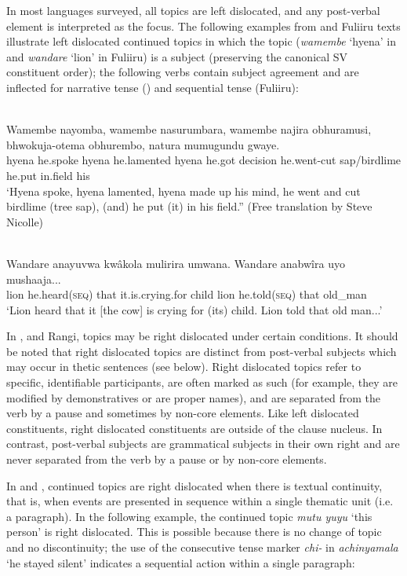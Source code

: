 \documentclass[output=paper]{langsci/langscibook}
\begin{document}
In most languages surveyed, all topics are left dislocated, and any post-verbal element is interpreted as the focus. The following examples from  and Fuliiru texts illustrate left dislocated continued topics in which the topic (\textit{wamembe} ‘hyena’ in  and \textit{wandare} ‘lion’ in Fuliiru) is a subject (preserving the canonical SV constituent order); the following verbs contain subject agreement and are inflected for narrative tense () and sequential tense (Fuliiru):

\ea\label{ex:9.nicolle}
\\
\gll Wamembe nayomba, wamembe nasurumbara, wamembe najira obhuramusi, bhwokuja-otema obhurembo, natura mumugundu gwaye.\\
     hyena he.spoke hyena he.lamented hyena he.got decision he.went-cut sap/birdlime he.put in.field his \\
\glt ‘Hyena spoke, hyena lamented, hyena made up his mind, he went and cut birdlime (tree sap), (and) he put (it) in his field.” (Free translation by Steve Nicolle)
\z

\ea\label{ex:10.nicolle}
\\
\gll Wandare anayuvwa kwâkola mulirira umwana. Wandare anabwîra uyo mushaaja...\\
lion he.heard(\textsc{seq}) that it.is.crying.for child lion he.told(\textsc{seq}) that old\_man  \\
\glt ‘\textup{Lion heard that it [the cow] is crying for (its) child. Lion told that old man...’}
\z

In ,  and Rangi, topics may be right dislocated under certain conditions. It should be noted that right dislocated topics are distinct from post-verbal subjects which may occur in thetic sentences (see  below). Right dislocated topics refer to specific, identifiable participants, are often marked as such (for example, they are modified by demonstratives or are proper names), and are separated from the verb by a pause and sometimes by non-core elements. Like left dislocated constituents, right dislocated constituents are outside of the clause nucleus. In contrast, post-verbal subjects are grammatical subjects in their own right and are never separated from the verb by a pause or by non-core elements.

In  and , continued topics are right dislocated when there is textual continuity, that is, when events are presented in sequence within a single thematic unit (i.e. a paragraph). In the following example, the continued topic \textit{mutu yuyu} ‘this person’ is right dislocated. This is possible because there is no change of topic and no discontinuity; the use of the consecutive tense marker \textit{chi-} in \textit{achinyamala} ‘he stayed silent’ indicates a sequential action within a single paragraph:
\end{document}
